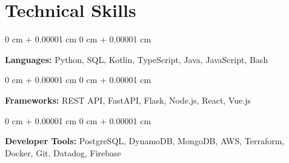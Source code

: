 \documentclass[10pt, letterpaper]{article}
\newenvironment{onecolentry}{
    \begin{adjustwidth}{
        0 cm + 0.00001 cm
    }{
        0 cm + 0.00001 cm
    }
}{
    \end{adjustwidth}
}
\begin{document}
    \vspace{0.10 cm}
    \section{Technical Skills}

    \begin{onecolentry}
        \textbf{Languages:} Python, SQL, Kotlin, TypeScript, Java, JavaScript, Bash
    \end{onecolentry}

    \vspace{0.1 cm}

    \begin{onecolentry}
        \textbf{Frameworks:} REST API, FastAPI, Flask, Node.js, React, Vue.js
    \end{onecolentry}

    \vspace{0.1 cm}

    \begin{onecolentry}
        \textbf{Developer Tools:} PostgreSQL, DynamoDB, MongoDB, AWS, Terraform, Docker, Git, Datadog, Firebase
    \end{onecolentry}
\end{document}

